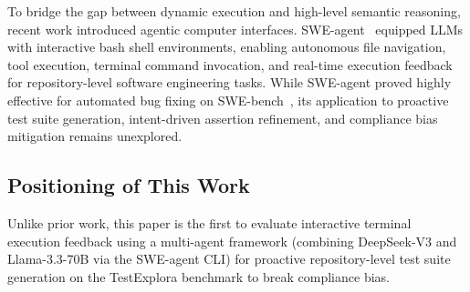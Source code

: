 To bridge the gap between dynamic execution and high-level semantic reasoning, recent work introduced agentic computer interfaces. SWE-agent~\cite{sweagent} equipped LLMs with interactive bash shell environments, enabling autonomous file navigation, tool execution, terminal command invocation, and real-time execution feedback for repository-level software engineering tasks. While SWE-agent proved highly effective for automated bug fixing on SWE-bench~\cite{swebench}, its application to proactive test suite generation, intent-driven assertion refinement, and compliance bias mitigation remains unexplored.

\subsection{Positioning of This Work}
Unlike prior work, this paper is the first to evaluate interactive terminal execution feedback using a multi-agent framework (combining DeepSeek-V3 and Llama-3.3-70B via the SWE-agent CLI) for proactive repository-level test suite generation on the TestExplora benchmark to break compliance bias.
